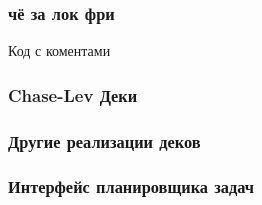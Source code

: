 \documentclass[hyperref={unicode}]{beamer}
\begin{document}
\begin{frame}
	\frametitle{чё за лок фри}

    Код с коментами
\end{frame}

\begin{frame}
	\frametitle{Chase-Lev Деки}
\end{frame}

\begin{frame}
	\frametitle{Другие реализации деков}


\end{frame}

\begin{frame}
    \frametitle{Интерфейс планировщика задач}
\end{frame}
\end{document}

